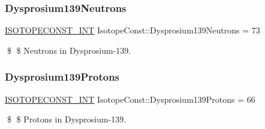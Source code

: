 \subsubsection{\texorpdfstring{Dysprosium139\+Neutrons}{Dysprosium139Neutrons}}
{\footnotesize\ttfamily \mbox{\hyperlink{group___isotope_const-_macros_ga5f18360b3e99483a35c32d789e62621c}{I\+S\+O\+T\+O\+P\+E\+C\+O\+N\+S\+T\+\_\+\+I\+NT}} Isotope\+Const\+::\+Dysprosium139\+Neutrons = 73}

\$ \$ Neutrons in Dysprosium-\/139. \mbox{\label{group___isotope_const-_dysprosium-_dy139_ga1c384d63989072cc8b0c2595cd90cc3c}} 
\subsubsection{\texorpdfstring{Dysprosium139\+Protons}{Dysprosium139Protons}}
{\footnotesize\ttfamily \mbox{\hyperlink{group___isotope_const-_macros_ga5f18360b3e99483a35c32d789e62621c}{I\+S\+O\+T\+O\+P\+E\+C\+O\+N\+S\+T\+\_\+\+I\+NT}} Isotope\+Const\+::\+Dysprosium139\+Protons = 66}

\$ \$ Protons in Dysprosium-\/139. 